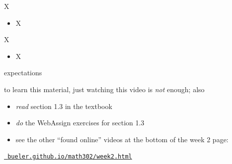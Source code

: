 \documentclass{beamer}
\begin{document}
\begin{frame}{X}

\begin{itemize}
\item X
\end{itemize}
\end{frame}


\begin{frame}{X}

\begin{itemize}
\item X
\end{itemize}
\end{frame}


\begin{frame}{expectations}

to learn this material, just watching this video is \emph{not} enough; also
\begin{itemize}
\item \emph{read} section 1.3 in the textbook
\item \emph{do} the WebAssign exercises for section 1.3
\item see the other ``found online'' videos at the bottom of the week 2 page:
\end{itemize}

\centerline{\href{https://bueler.github.io/math302/week2.html}{\tt \color{cyan} bueler.github.io/math302/week2.html}}
\end{frame}
\end{document}
